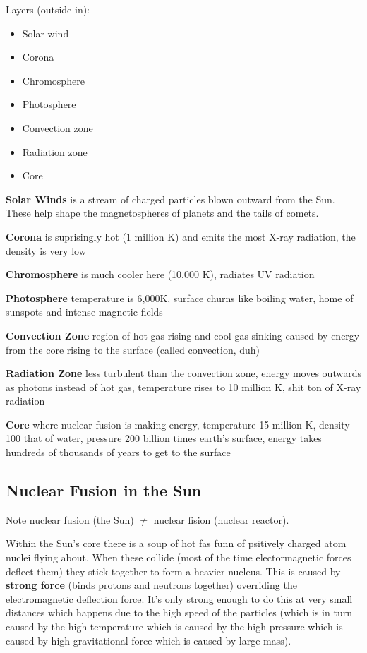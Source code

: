 \documentclass[12pt]{article}
\begin{document}
Layers (outside in):
\begin{itemize}
    \item Solar wind
    \item Corona
    \item Chromosphere
    \item Photosphere
    \item Convection zone
    \item Radiation zone
    \item Core
\end{itemize}
\textbf{Solar Winds} is a stream of charged particles blown outward from the Sun. These help shape the magnetospheres of planets and the tails of comets.

\textbf{Corona} is suprisingly hot (1 million K) and emits the most X-ray radiation, the density is very low

\textbf{Chromosphere} is much cooler here (10,000 K), radiates UV radiation

\textbf{Photosphere} temperature is 6,000K, surface churns like boiling water, home of sunspots and intense magnetic fields

\textbf{Convection Zone} region of hot gas rising and cool gas sinking caused by energy from the core rising to the surface (called convection, duh)

\textbf{Radiation Zone} less turbulent than the convection zone, energy moves outwards as photons instead of hot gas, temperature rises to 10 million K, shit ton of X-ray radiation

\textbf{Core} where nuclear fusion is making energy, temperature 15 million K, density 100 that of water, pressure 200 billion times earth's surface, energy takes hundreds of thousands of years to get to the surface

\subsection{Nuclear Fusion in the Sun}
Note nuclear fusion (the Sun) $\not =$ nuclear fision (nuclear reactor).

Within the Sun's core there is a soup of hot fas funn of psitively charged atom nuclei flying about. When these collide (most of the time electormagnetic forces deflect them) they stick together to form a heavier nucleus. This is caused by \textbf{strong force} (binds protons and neutrons together) overriding the electromagnetic deflection force. It's only strong enough to do this at very small distances which happens due to the high speed of the particles (which is in turn caused by the high temperature which is caused by the high pressure which is caused by high gravitational force which is caused by large mass).
\end{document}
